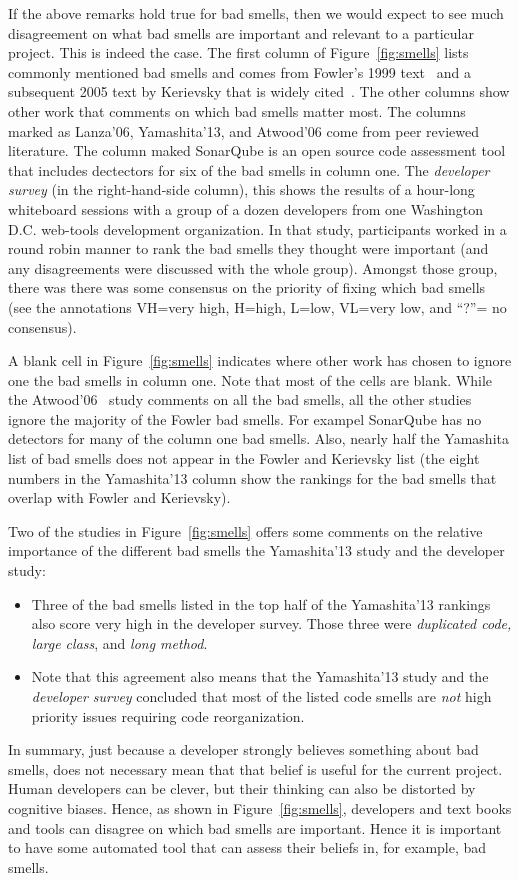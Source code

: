 \documentclass{sig-alternate}
\newcommand{\fig}[1]{Figure~\ref{fig:#1}}
\begin{document}
If the above remarks hold true for bad smells, then we would expect
to see much disagreement on what bad smells are important and relevant
to  a particular project. This is indeed the case.
The first column of \fig{smells} 
lists  commonly mentioned bad smells and comes from Fowler's 1999 text~\cite{Fowler99} and a subsequent 2005 text by Kerievsky that is widely cited~\cite{Kerievsky2005}.
The other
columns show other work that comments on which bad smells matter most.
The columns marked as Lanza'06, Yamashita'13, and Atwood'06 come from
peer reviewed literature. The column maked SonarQube is an open source
code assessment tool that includes dectectors for six of the bad smells
in column one. 
The {\em developer survey}   (in the right-hand-side column),
   this shows the results of a hour-long whiteboard sessions with a group of a
 dozen developers from one Washington
    D.C. web-tools development organization. In that study, participants
    worked in a round robin manner to rank the bad smells they thought were
    important (and any disagreements were discussed with the whole group).
     Amongst those group, there was there was  some
    consensus on  the priority of fixing which  bad smells   
    (see the annotations VH=very high,
    H=high, L=low, VL=very low, and ``?''= no consensus).  
    
A  blank cell in \fig{smells}
indicates where   other work has chosen to ignore
one the   bad smells in column one. 
Note that most of the cells are blank.
While the Atwood'06~\cite{Atwood06} study  comments on   
all the   bad smells,
all the  other  studies ignore the majority of the Fowler bad smells.
For exampel SonarQube has no detectors for many of the column one bad smells.
Also, nearly half the Yamashita list of bad smells
    does not appear in the Fowler and Kerievsky list
    (the eight numbers
    in the  Yamashita'13 column show the rankings for the bad smells 
    that overlap with Fowler and Kerievsky).
    

Two of the studies in \fig{smells} offers some comments on the relative importance
of the different bad smells the   Yamashita'13 study and the developer study:
    \begin{itemize}
        \item Three of the bad smells listed in the top half of the Yamashita'13 rankings also score very high in the developer survey. Those three were {\em duplicated code, large class}, 
        and {\em long method}.
        \item
 Note that this agreement also means that the
  Yamashita'13 study and the {\em developer survey}   concluded
        that most of the  listed code smells are {\em not} high priority issues
        requiring code reorganization. 
 \end{itemize} 
In summary, just because a developer strongly believes something
about bad smells, does
not necessary mean that that belief is useful for the current project.
Human developers can be clever, but their thinking can also be distorted
by cognitive biases.
Hence, as shown in \fig{smells}, developers and text books and tools 
can disagree on which bad smells are important.
Hence it is important to have some automated tool
that can assess their beliefs in, for example,
bad smells.  
 
\end{document}
